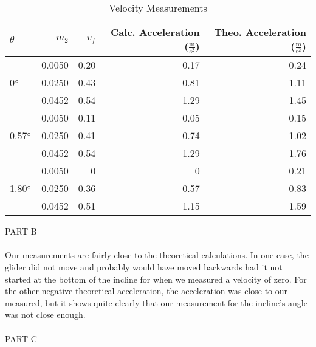 \documentclass [12pt, letterpaper, twoside] {article}
\begin{document}
\begin {table}[h]
  \centering
  \begin {tabular} {| l | r | r | r | r |}
    \hline\hline
    \(\theta\) & \(m_{2}\) & \(v_{f}\) & Calc. Acceleration (\(\tfrac{\text{m}}{\text{s}^2}\)) & Theo. Acceleration (\(\tfrac{\text{m}}{\text{s}^2}\)) \\
    \hline
    \multirow {3}{*}{0\(\degree\)} & 0.0050 & 0.20 & 0.17 & 0.24 \\ %
    & 0.0250 & 0.43 & 0.81 & 1.11 \\ %
    & 0.0452 & 0.54 & 1.29 & 1.45 \\ %
    \hline
    \multirow {3}{*}{0.57\(\degree\)} & 0.0050 & 0.11 & 0.05 & 0.15 \\ %
    & 0.0250 & 0.41 & 0.74 & 1.02 \\ %
    & 0.0452 & 0.54 & 1.29 & 1.76 \\ %
    \hline
    \multirow {3}{*}{1.80\(\degree\)} & 0.0050 & 0 & 0 & 0.21 \\ %
    & 0.0250 & 0.36 & 0.57 & 0.83 \\ %
    & 0.0452 & 0.51 & 1.15 & 1.59 \\ %
    \hline\hline
  \end {tabular}
  \caption {Velocity Measurements}
\end {table}

\noindent
PART B \\\\
Our measurements are fairly close to the theoretical calculations. In one case, the glider did not move and probably would have moved backwards had it not started at the bottom of the incline for when we measured a velocity of zero. For the other negative theoretical acceleration, the acceleration was close to our measured, but it shows quite clearly that our measurement for the incline's angle was not close enough. \\\\

\noindent
PART C \\
\end{document}
